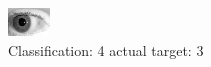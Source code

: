 \begin{figure}[h!]
\begin{center}
\includegraphics[width=0.60\columnwidth]{figures/ID275_class_4_target_3.png}
\end{center}
\caption{ Classification: 4 actual target: 3}
\label{fig:ID275_class_4_target_3}
\end{figure}
